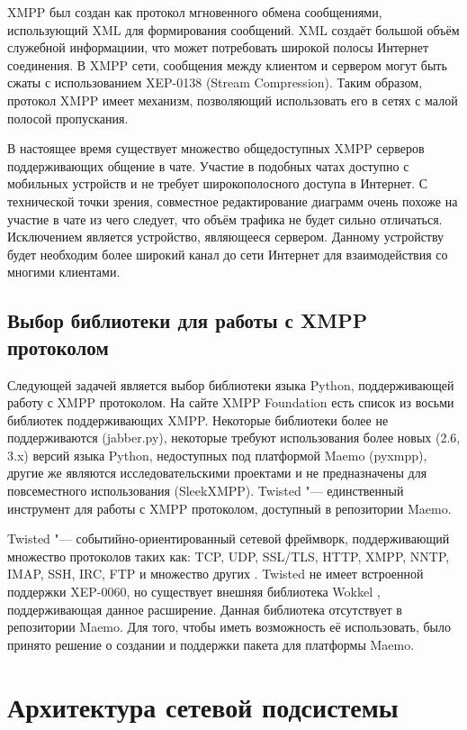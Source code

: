 XMPP был создан как протокол мгновенного обмена сообщениями, использующий XML
для формирования сообщений. XML создаёт большой объём служебной информациии, что
может потребовать широкой полосы Интернет соединения. В XMPP сети, сообщения
между клиентом и сервером могут быть сжаты с использованием XEP-0138 (Stream
Compression). Таким образом, протокол XMPP имеет механизм, позволяющий
использовать его в сетях с малой полосой пропускания.

В настоящее время существует множество общедоступных XMPP серверов
поддерживающих общение в чате. Участие в подобных чатах доступно с мобильных
устройств и не требует широкополосного доступа в Интернет. С технической точки
зрения, совместное редактирование диаграмм очень похоже на участие в чате из
чего следует, что объём трафика не будет сильно отличаться. Исключением является
устройство, являющееся сервером. Данному устройству будет необходим более
широкий канал до сети Интернет для взаимодействия со многими клиентами.

\subsection{Выбор библиотеки для работы с XMPP протоколом}
Следующей задачей является выбор библиотеки языка Python, поддерживающей работу
с XMPP протоколом. На сайте XMPP Foundation \cite{xmpp} есть список из восьми
библиотек поддерживающих XMPP. Некоторые библиотеки более не поддерживаются
(jabber.py), некоторые требуют использования более новых (2.6, 3.x) версий языка
Python, недоступных под платформой Maemo (pyxmpp), другие же являются
исследовательскими проектами и не предназначены для повсеместного использования
(SleekXMPP). Twisted "--- единственный инструмент для работы с XMPP протоколом,
доступный в репозитории Maemo.

Twisted "--- событийно-ориентированный сетевой фреймворк, поддерживающий
множество протоколов таких как: TCP, UDP, SSL/TLS, HTTP, XMPP, NNTP, IMAP, SSH,
IRC, FTP и множество других \cite{twisted}. Twisted не имеет встроенной
поддержки XEP-0060, но существует внешняя библиотека Wokkel \cite{wokkel},
поддерживающая данное расширение. Данная библиотека отсутствует в репозитории
Maemo. Для того, чтобы иметь возможность её использовать, было принято решение о
создании и поддержки пакета для платформы Maemo.

\section{Архитектура сетевой подсистемы}
